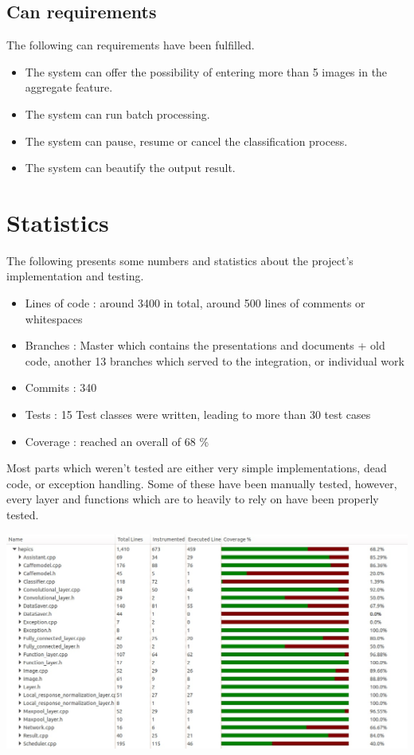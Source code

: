 \documentclass[parskip=full]{scrartcl}
\begin{document}
\subsection {Can requirements}
The following can requirements have been fulfilled.
\begin{itemize}
	\item The system can offer the possibility of entering more than 5 images in the aggregate feature.
	\item The system can run batch processing.
	\item The system can pause, resume or cancel the classification process.
	\item The system can beautify the output result.
\end{itemize}

\pagebreak
	
\section {Statistics}
The following presents some numbers and statistics about the project's implementation and testing.
\begin {itemize}
	\item Lines of code : around 3400 in total, around 500 lines of comments or whitespaces
	\item Branches : Master which contains the presentations and documents + old code, another 13 branches which served to the integration, or individual work
	\item Commits : 340
	\item Tests : 15 Test classes were written, leading to more than 30 test cases
	\item Coverage : reached an overall of 68 \% 
\end {itemize}
Most parts which weren't tested are either very simple implementations, dead code, or exception handling. Some of these have been manually tested, however, every layer and functions which are to heavily to rely on have been properly tested.

\includegraphics[width=1.2\textwidth, center]{hepics_coverage}
\end{document}

